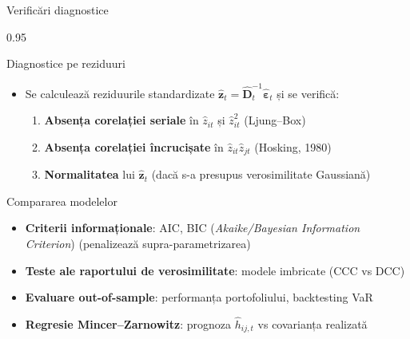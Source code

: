 \documentclass[9pt, aspectratio=169, t]{beamer}
\begin{document}
\begin{frame}{Verificări diagnostice}
    \begin{cminipage}{0.95\textwidth}
    {\footnotesize
    \begin{block}{Diagnostice pe reziduuri}
        \begin{itemize}\setlength{\itemsep}{0pt}
            \item Se calculează reziduurile standardizate $\hat{\mathbf{z}}_t = \hat{\mathbf{D}}_t^{-1}\hat{\boldsymbol{\varepsilon}}_t$ și se verifică:
                \begin{enumerate}\setlength{\itemsep}{0pt}
                    \item \textbf{Absența corelației seriale} în $\hat{z}_{it}$ și $\hat{z}_{it}^2$ (Ljung--Box)
                    \item \textbf{Absența corelației încrucișate} în $\hat{z}_{it}\hat{z}_{jt}$ (Hosking, 1980)
                    \item \textbf{Normalitatea} lui $\hat{\mathbf{z}}_t$ (dacă s-a presupus verosimilitate Gaussiană)
                \end{enumerate}
        \end{itemize}
    \end{block}
    \begin{block}{Compararea modelelor}
        \begin{itemize}\setlength{\itemsep}{0pt}
            \item \textbf{Criterii informaționale}: AIC, BIC (\textit{Akaike/Bayesian Information Criterion}) (penalizează supra-parametrizarea)
            \item \textbf{Teste ale raportului de verosimilitate}: modele imbricate (CCC vs DCC)
            \item \textbf{Evaluare out-of-sample}: performanța portofoliului, backtesting VaR
            \item \textbf{Regresie Mincer--Zarnowitz}: prognoza $\hat{h}_{ij,t}$ vs covarianța realizată
        \end{itemize}
    \end{block}
    }
    \end{cminipage}
\end{frame}
\end{document}
